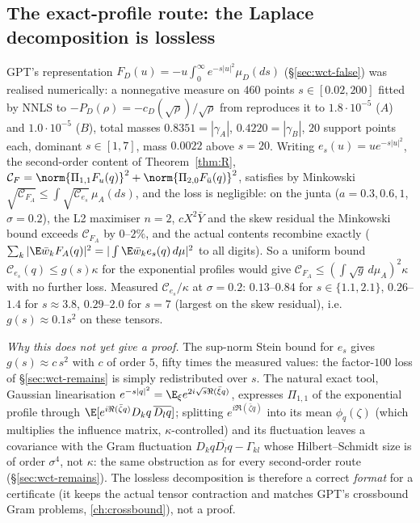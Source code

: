 \subsection{The exact-profile route: the Laplace decomposition is lossless}\label{sec:ab-laplace}
GPT's representation $F_D(u)=-u\int_0^\infty e^{-s|u|^2}\mu_D(ds)$ (\S\ref{sec:wct-false}) was realised numerically: a nonnegative measure on $460$ points $s\in[0.02,200]$ fitted by
NNLS to $-P_D(\rho)=-c_D(\sqrt\rho)/\sqrt\rho$ from  reproduces it to $1.8\cdot10^{-5}$ ($A$) and $1.0\cdot10^{-5}$ ($B$), total masses $0.8351=|\gamma_A|$,
$0.4220=|\gamma_B|$, $20$ support points each, dominant $s\in[1,7]$, mass $0.0022$ above $s=20$. Writing $e_s(u)=ue^{-s|u|^2}$, the second-order content of Theorem~\ref{thm:R},
$\mathcal C_F=\norm{\Pi_{1,1}F_u(q)}^2+\norm{\Pi_{2,0}F_{\bar u}(q)}^2$, satisfies by Minkowski $\sqrt{\mathcal C_{F_A}}\le\int\sqrt{\mathcal C_{e_s}}\,\mu_A(ds)$, and the loss is negligible:
on the junta ($a=0.3,0.6,1$, $\sigma=0.2$), the L2 maximiser $n=2$, $cX^2\bar Y$ and the skew residual the Minkowski bound exceeds $\mathcal C_{F_A}$ by $0$--$2\%$, and the actual
contents recombine exactly ($\sum_k|\E\bar w_kF_A(q)|^2=|\int\E\bar w_ke_s(q)\,d\mu|^2$ to all digits). So a uniform bound $\mathcal C_{e_s}(q)\le g(s)\kappa$ for the exponential
profiles would give $\mathcal C_{F_A}\le(\int\sqrt{g}\,d\mu_A)^2\kappa$ with no further loss. Measured $\mathcal C_{e_s}/\kappa$ at $\sigma=0.2$: $0.13$--$0.84$ for $s\in\{1.1,2.1\}$,
$0.26$--$1.4$ for $s\approx3.8$, $0.29$--$2.0$ for $s=7$ (largest on the skew residual), i.e.\ $g(s)\approx0.1s^2$ on these tensors.

\emph{Why this does not yet give a proof.} The sup-norm Stein bound for $e_s$ gives $g(s)\approx c\,s^2$ with $c$ of order $5$, fifty times the measured values: the factor-$100$
loss of \S\ref{sec:wct-remains} is simply redistributed over $s$. The natural exact tool, Gaussian linearisation $e^{-s|q|^2}=\E_\xi e^{2i\sqrt s\Re(\bar\xi q)}$, expresses
$\Pi_{1,1}$ of the exponential profile through $\E[e^{i\Re(\bar\zeta q)}D_kq\,\overline{D_lq}]$; splitting $e^{i\Re(\bar\zeta q)}$ into its mean $\phi_q(\zeta)$ (which multiplies the
influence matrix, $\kappa$-controlled) and its fluctuation leaves a covariance with the Gram fluctuation $D_kq\overline{D_lq}-\Gamma_{kl}$ whose Hilbert--Schmidt size is of order
$\sigma^4$, not $\kappa$: the same obstruction as for every second-order route (\S\ref{sec:wct-remains}). The lossless decomposition is therefore a correct \emph{format} for a
certificate (it keeps the actual tensor contraction and matches GPT's crossbound Gram problems, \autoref{ch:crossbound}), not a proof.

